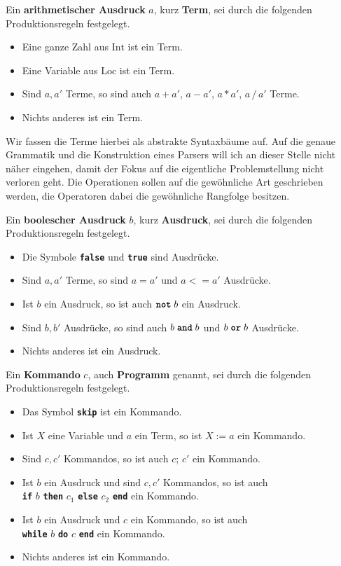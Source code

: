 \documentclass[8pt,fleqn,aspectratio=169]{beamer}
\newcommand{\strong}[1]{\textsf{\textbf{#1}}}
\newcommand{\kw}[1]{\textbf{\texttt{#1}}}
\newcommand{\Int}{\mathrm{Int}}
\newcommand{\Loc}{\mathrm{Loc}}
\begin{document}
\begin{frame}
Ein \strong{arithmetischer Ausdruck} $a$, kurz \strong{Term}, sei durch die
folgenden Produktionsregeln festgelegt.
\begin{itemize}
\item Eine ganze Zahl aus $\Int$ ist ein Term.
\item Eine Variable aus $\Loc$ ist ein Term.
\item Sind $a,a'$ Terme, so sind auch $a+a'$, $a-a'$, $a*a'$, $a\,/\,a'$ Terme.
\item Nichts anderes ist ein Term.
\end{itemize}
{\footnotesize Wir fassen die Terme hierbei als abstrakte Syntaxbäume auf.
Auf die genaue Grammatik und die Konstruktion eines Parsers will ich
an dieser Stelle nicht näher eingehen, damit der Fokus auf die
eigentliche Problemstellung nicht verloren geht. Die Operationen sollen
auf die gewöhnliche Art geschrieben werden, die Operatoren dabei die
gewöhnliche Rangfolge besitzen.}
\end{frame}

\begin{frame}
Ein \strong{boolescher Ausdruck} $b$, kurz \strong{Ausdruck}, sei durch
die folgenden Produktionsregeln festgelegt.
\begin{itemize}
\item Die Symbole \kw{false} und \kw{true} sind Ausdrücke.
\item Sind $a,a'$ Terme, so sind $a=a'$ und $a <= a'$ Ausdrücke.
\item Ist $b$ ein Ausdruck, so ist auch $\kw{not}\;b$ ein Ausdruck.
\item Sind $b,b'$ Ausdrücke, so sind auch $b\;\kw{and}\;b$ und $b\;\kw{or}\;b$ Ausdrücke.
\item Nichts anderes ist ein Ausdruck.
\end{itemize}
\end{frame}

\begin{frame}
Ein \strong{Kommando} $c$, auch \strong{Programm} genannt, sei durch die
folgenden Produktionsregeln festgelegt.
\begin{itemize}
\item Das Symbol \kw{skip} ist ein Kommando.
\item Ist $X$ eine Variable und $a$ ein Term, so ist $X:=a$ ein Kommando.
\item Sind $c,c'$ Kommandos, so ist auch $c$; $c'$ ein Kommando.
\item Ist $b$ ein Ausdruck und sind $c,c'$ Kommandos, so ist auch\\
  \kw{if} $b$ \kw{then} $c_1$ \kw{else} $c_2$ \kw{end} ein Kommando.
\item Ist $b$ ein Ausdruck und $c$ ein Kommando, so ist auch\\
  \kw{while} $b$ \kw{do} $c$ \kw{end} ein Kommando.
\item Nichts anderes ist ein Kommando.
\end{itemize}
\end{frame}
\end{document}
